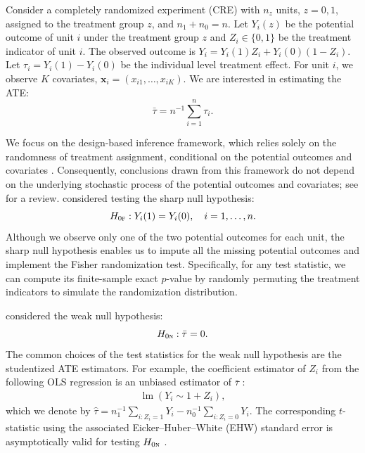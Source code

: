 \documentclass[12pt]{article}
\newcommand{\lmm}{\operatorname{lm}}
\newcommand{\bs}{\boldsymbol}
\newcommand{\sumi}{\sum_{i=1}^n}
\begin{document}
Consider a completely randomized experiment (CRE) with $n_z$ units, $z=0,1$, assigned to the treatment group $z$, and $n_1+n_0=n$. Let $Y_i(z)$ be the potential outcome of unit $i$ under the treatment group $z$ and $Z_i\in\{0,1\}$ be the treatment indicator of unit $i$. The observed outcome is $Y_i = Y_i(1)Z_i + Y_i(0)(1-Z_i)$. Let $\tau_i = Y_i(1)-Y_i(0)$ be the individual level treatment effect. For unit $i$, we observe $K$ covariates, $\bs{x}_i = ({x}_{i1},\ldots,{x}_{iK})$.  We are interested in estimating the ATE:
 $$\bar{\tau} = n^{-1}\sumi \tau_i.$$  
 
 We focus on the design-based inference framework, which relies solely on the
randomness of treatment assignment, conditional on the potential outcomes and covariates \citep{neyman1923,freedman2008regression,imbens2015causal}. Consequently, conclusions drawn from this framework do not depend on the underlying stochastic process of the potential outcomes and covariates; see \citet{li2017general} for a review.  \citet{fisher1935design} considered testing the sharp null hypothesis:
\[
H_{0\textsc{f}}: Y_i(1)=Y_i(0),\quad i=1,\ldots,n.
\]
Although we observe only one of the two potential outcomes for each unit, the sharp null hypothesis enables us to impute all the missing potential outcomes and implement the Fisher randomization test. Specifically, for any test statistic, we can compute its finite-sample exact $p$-value by randomly permuting the treatment indicators to simulate the randomization distribution. 

\citet{neyman1923} considered the weak null hypothesis: $$H_{0\textsc{n}}: \bar{\tau} = 0.$$
The common choices of the test statistics for the weak null hypothesis are the studentized ATE estimators. For example, the coefficient estimator of $Z_i$ from the following OLS regression is an unbiased estimator of $\bar{\tau}$ \citep[Theorem 1]{freedman2008regression}:
\begin{align}
\label{eq:unadjusted-OLS}
     \lmm(Y_i\sim 1+Z_i),
\end{align}
 which we denote by $\hat{\tau} = n_1^{-1}\sum_{i:Z_i=1}Y_i-n_0^{-1}\sum_{i:Z_i=0}Y_i$.
The corresponding $t$-statistic using the associated Eicker–Huber–White (EHW) standard error is 
asymptotically valid for testing $H_{0\textsc{n}}$ \citep[chap.~4]{ding2024first}.
    
\end{document}
